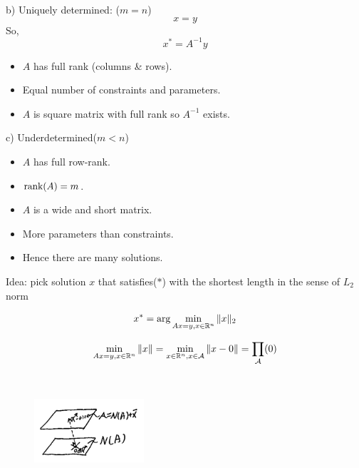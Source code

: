 b) Uniquely determined: ($m =n$)
\begin{equation*}
[A]x = y
\end{equation*}
So,
\begin{equation*}
x^* = A^{-1}y
\end{equation*}

\begin{itemize}
	\item $A$ has full rank (columns \& rows).
	
	\item Equal number of constraints and parameters.
	
	\item $A$ is square matrix with full rank so $A^{-1}$ exists.
\end{itemize}

c) Underdetermined($m<n$)

\begin{itemize}
	\item $A$ has full row-rank.
	
	\item $\operatorname{rank}(A) = m$.
	 
	\item $A$ is a wide and short matrix.
	
	\item More parameters than constraints.
	
	\item Hence there are many solutions.
\end{itemize}

Idea: pick solution $x$ that satisfies($*$) with the shortest length in the sense of $L_2$ norm

\begin{equation*}
x^* = \arg  \min_{Ax = y, x\in \mathbb{R}^n}\Vert x\Vert _2
\end{equation*}

\begin{equation*}
\min_{Ax = y, x\in \mathbb{R}^n}\Vert x\Vert  = \min_{x\in \mathbb{R}^n, x\in \mathcal{A}}\Vert x - 0\Vert  = \prod_{\mathcal{A}}(0)
\end{equation*}


\begin{figure}
	\centering
	\includegraphics[width=1.6in,height=1.6in]{figures/ch06/figure3.png}
\end{figure}

